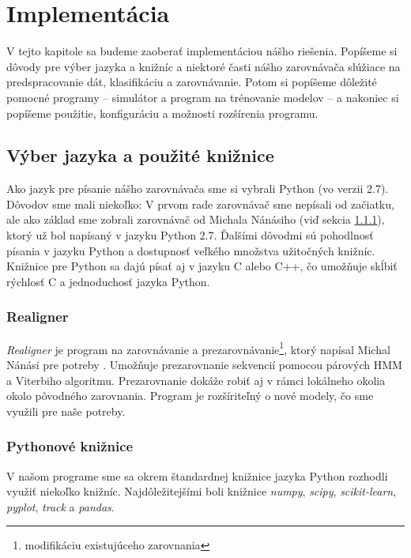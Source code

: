 \chapter{Implementácia}
\label{chap:implementation}

V tejto kapitole sa budeme zaoberať implementáciou nášho riešenia. Popíšeme si dôvody pre výber jazyka a knižníc a niektoré časti nášho zarovnávača slúžiace na predspracovanie dát, klasifikáciu a zarovnávanie. Potom si popíšeme dôležité pomocné programy -- simulátor a program na trénovanie modelov -- a nakoniec si popíšeme použitie, konfiguráciu a možnosti rozšírenia programu.

\section{Výber jazyka a použité knižnice}
Ako jazyk pre písanie nášho zarovnávača sme si vybrali Python (vo verzii 2.7). Dôvodov sme mali niekoľko: V prvom rade zarovnávač sme nepísali od začiatku, ale ako základ sme zobrali zarovnávač od Michala Nánásiho (viď sekcia \ref{subsec:realigner}), ktorý už bol napísaný v jazyku Python 2.7. Ďalšími dôvodmi sú pohodlnosť písania v jazyku Python a dostupnosť veľkého množstva užitočných knižníc. Knižnice pre Python sa dajú písať aj v jazyku C alebo C++, čo umožňuje skĺbiť rýchlosť C a jednoduchosť jazyka Python.

\subsection{Realigner}
\label{subsec:realigner}

\textit{Realigner} je program na zarovnávanie a prezarovnávanie\footnote{modifikáciu existujúceho zarovnania}, ktorý napísal Michal Nánási pre potreby \cite{nanasi2013probabilistic}. Umožňuje prezarovnanie sekvencií pomocou párových HMM a Viterbiho algoritmu. Prezarovnanie dokáže robiť aj v rámci lokálneho okolia okolo pôvodného zarovnania. Program je rozšíriteľný o nové modely, čo sme využili pre naše potreby.

\subsection{Pythonové knižnice}
V našom programe sme sa okrem štandardnej knižnice jazyka Python rozhodli využiť niekoľko knižníc. Najdôležitejšími boli knižnice \textit{numpy}, \textit{scipy}, \textit{scikit-learn}, \textit{pyplot}, \textit{track} a \textit{pandas}.

